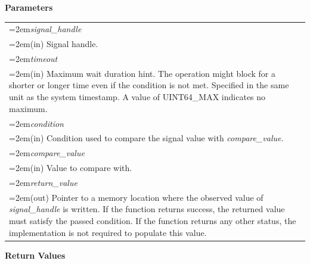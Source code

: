\documentclass[final]{book}
\newcommand{\hsaarg}[1]{\textit{#1}}
\begin{document}
\noindent\textbf{Parameters}\\[-6mm]
\noindent\begin{longtable}{@{}>{\hangindent=2em}p{\textwidth}}
\hsaarg{signal_handle}\\\hspace{2em}(in) Signal handle.\\[2mm]
\hsaarg{timeout}\\\hspace{2em}(in) Maximum wait duration hint. The operation might block for a shorter or longer time even if the condition is not met. Specified in the same unit as the system timestamp. A value of UINT64_MAX indicates no maximum.\\[2mm]
\hsaarg{condition}\\\hspace{2em}(in) Condition used to compare the signal value with \textit{compare_value}.\\[2mm]
\hsaarg{compare_value}\\\hspace{2em}(in) Value to compare with.\\[2mm]
\hsaarg{return_value}\\\hspace{2em}(out) Pointer to a memory location where the observed value of \textit{signal_handle} is written. If the function returns success, the returned value must satisfy the passed condition. If the function returns any other status, the implementation is not required to populate this value.
\end{longtable}
\vspace{-5mm}\noindent\textbf{Return Values}\\[-6mm]
\end{document}
